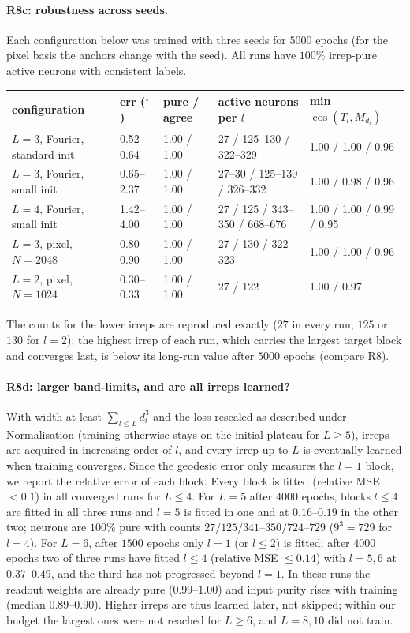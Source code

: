 \documentclass[a4paper,11pt]{article}
\theoremstyle{remark}
\theoremstyle{definition}
\begin{document}
\paragraph{R8c: robustness across seeds.} Each configuration below was trained
with three seeds for $5000$ epochs (for the pixel basis the anchors change with the
seed). All runs have $100\%$ irrep-pure active neurons with consistent labels.

\begin{center}\small
\begin{tabular}{lllll}
\hline
configuration & err ($^\circ$) & pure / agree & active neurons per $l$ & min $\cos(T_l,M_{d_l})$\\
\hline
$L{=}3$, Fourier, standard init & 0.52--0.64 & 1.00 / 1.00 & 27 / 125--130 / 322--329 & 1.00 / 1.00 / 0.96\\
$L{=}3$, Fourier, small init & 0.65--2.37 & 1.00 / 1.00 & 27--30 / 125--130 / 326--332 & 1.00 / 0.98 / 0.96\\
$L{=}4$, Fourier, small init & 1.42--4.00 & 1.00 / 1.00 & 27 / 125 / 343--350 / 668--676 & 1.00 / 1.00 / 0.99 / 0.95\\
$L{=}3$, pixel, $N=2048$ & 0.80--0.90 & 1.00 / 1.00 & 27 / 130 / 322--323 & 1.00 / 1.00 / 0.96\\
$L{=}2$, pixel, $N=1024$ & 0.30--0.33 & 1.00 / 1.00 & 27 / 122 & 1.00 / 0.97\\
\hline
\end{tabular}
\end{center}

The counts for the lower irreps are reproduced exactly ($27$ in every run; $125$
or $130$ for $l=2$); the highest irrep of each run, which carries the largest target
block and converges last, is below its long-run value after $5000$ epochs
(compare R8).

\paragraph{R8d: larger band-limits, and are all irreps learned?} With width at
least $\sum_{l\le L}d_l^3$ and the loss rescaled as described under Normalisation
(training otherwise stays on the initial plateau for $L\ge5$), irreps are acquired
in increasing order of $l$, and every irrep up to $L$ is eventually learned when
training converges. Since the geodesic error only measures the $l=1$ block, we
report the relative error of each block. Every block is fitted (relative MSE
$<0.1$) in all converged runs for $L\le4$. For $L=5$ after $4000$ epochs, blocks
$l\le4$ are fitted in all three runs and $l=5$ is fitted in one and at $0.16$--$0.19$
in the other two; neurons are $100\%$ pure with counts
$27/125/341$--$350/724$--$729$ ($9^3=729$ for $l=4$). For $L=6$, after $1500$ epochs
only $l=1$ (or $l\le2$) is fitted; after $4000$ epochs two of three runs have fitted
$l\le4$ (relative MSE $\le0.14$) with $l=5,6$ at $0.37$--$0.49$, and the third has
not progressed beyond $l=1$. In these runs the readout weights are already pure
($0.99$--$1.00$) and input purity rises with training (median $0.89$--$0.90$).
Higher irreps are thus learned later, not skipped; within our budget the largest
ones were not reached for $L\ge6$, and $L=8,10$ did not train.
\end{document}

